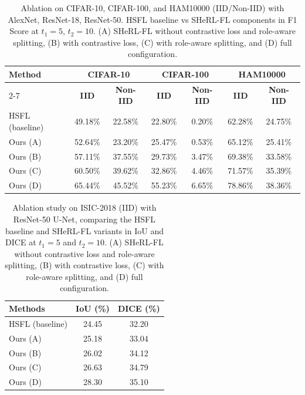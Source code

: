 \documentclass[letterpaper]{article} %
\begin{document}
        \begin{table}
            \centering
            \begin{tabular}{l|cc|cc|cc}
                \hline
                \multirow{2}{*}{\textbf{Method}} &
                \multicolumn{2}{c|}{\textbf{CIFAR-10}} &
                \multicolumn{2}{c|}{\textbf{CIFAR-100}} &
                \multicolumn{2}{c}{\textbf{HAM10000}} \\
                \cline{2-7}
                 & \textbf{IID} & \textbf{Non-IID} & \textbf{IID} & \textbf{Non-IID} & \textbf{IID} & \textbf{Non-IID} \\
                \hline
                HSFL (baseline) & 49.18\% & 22.58\% & 22.80\% & 0.20\% & 62.28\% & 24.75\% \\
                Ours (A) & 52.64\% & 23.20\% & 25.47\% & 0.53\% & 65.12\% & 25.41\% \\
                Ours (B) & 57.11\% & 37.55\% & 29.73\% & 3.47\% & 69.38\% & 33.58\% \\
                Ours (C) & 60.50\% & 39.62\% & 32.86\% & 4.46\% & 71.57\% & 35.39\% \\
                Ours (D) & 65.44\% & 45.52\% & 55.23\% & 6.65\% & 78.86\% & 38.36\% \\
                \hline
            \end{tabular}
            \caption{Ablation on CIFAR-10, CIFAR-100, and HAM10000 (IID/Non-IID) with AlexNet, ResNet-18, ResNet-50. HSFL baseline vs SHeRL-FL components in F1 Score at $t_1=5$, $t_2=10$. (A) SHeRL-FL without contrastive loss and role-aware splitting, (B) with contrastive loss, (C) with role-aware splitting, and (D) full configuration.}
            \label{tab:ablation}
        \end{table}
        \begin{table}[!ht]
            \centering
            \begin{tabular}{l|c|c}
            \hline
            \centering\textbf{Methods} & \textbf{IoU (\%)} & \textbf{DICE (\%)} \\ \hline
            HSFL (baseline) & 24.45 & 32.20 \\
            Ours (A) & 25.18 & 33.04 \\
            Ours (B) & 26.02 & 34.12 \\
            Ours (C) & 26.63 & 34.79 \\
            Ours (D)& 28.30 & 35.10 \\
            \hline
            \end{tabular}
            \caption{Ablation study on ISIC-2018 (IID) with ResNet-50 U-Net, comparing the HSFL baseline and SHeRL-FL variants in IoU and DICE at $t_1=5$ and $t_2=10$. (A) SHeRL-FL without contrastive loss and role-aware splitting, (B) with contrastive loss, (C) with role-aware splitting, and (D) full configuration.}
            \label{tab:ablation_segmentation}
        \end{table}
\end{document}
